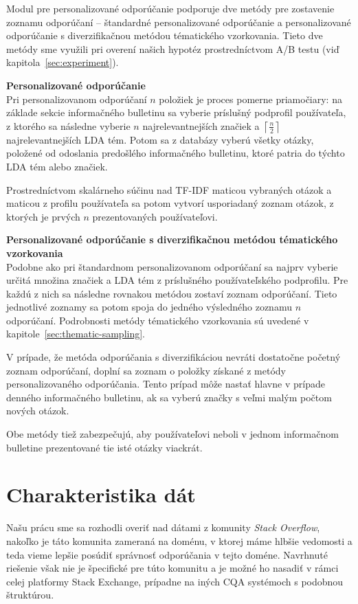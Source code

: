 Modul pre personalizované odporúčanie podporuje dve metódy pre zostavenie zoznamu odporúčaní -- štandardné personalizované
odporúčanie a personalizované odporúčanie s diverzifikačnou metódou tématického vzorkovania. Tieto dve metódy sme využili
pri overení našich hypotéz prostredníctvom A/B testu (viď kapitola~\ref{sec:experiment}).

\textbf{Personalizované odporúčanie}\\
Pri personalizovanom odporúčaní $n$ položiek je proces pomerne priamočiary: na základe sekcie informačného bulletinu
sa vyberie príslušný podprofil používateľa, z ktorého sa následne vyberie $n$ najrelevantnejších značiek
a $\left\lceil\frac{n}{2}\right\rceil$ najrelevantnejších LDA tém. Potom sa z databázy vyberú všetky otázky, položené
od odoslania predošlého informačného bulletinu, ktoré patria do týchto LDA tém alebo značiek.

Prostredníctvom skalárneho súčinu nad TF-IDF maticou vybraných otázok a maticou z profilu používateľa sa potom vytvorí
usporiadaný zoznam otázok, z ktorých je prvých $n$ prezentovaných používateľovi.

\textbf{Personalizované odporúčanie s diverzifikačnou metódou tématického vzorkovania}\\
Podobne ako pri štandardnom personalizovanom odporúčaní sa najprv vyberie určitá množina značiek a LDA tém z
príslušného používateľského podprofilu. Pre každú z nich sa následne rovnakou metódou zostaví zoznam odporúčaní.
Tieto jednotlivé zoznamy sa potom spoja do jedného výsledného zoznamu $n$ odporúčaní. Podrobnosti metódy tématického
vzorkovania sú uvedené v kapitole~\ref{sec:thematic-sampling}.

V prípade, že metóda odporúčania s diverzifikáciou nevráti dostatočne početný zoznam odporúčaní, doplní sa zoznam
o položky získané z metódy personalizovaného odporúčania. Tento prípad môže nastať hlavne v prípade denného informačného
bulletinu, ak sa vyberú značky s veľmi malým počtom nových otázok.

Obe metódy tiež zabezpečujú, aby používateľovi neboli v jednom informačnom bulletine prezentované tie isté otázky
viackrát.


\section{Charakteristika dát}

Našu prácu sme sa rozhodli overiť nad dátami z komunity \textit{Stack Overflow},
nakoľko je táto komunita zameraná na doménu, v ktorej máme hlbšie vedomosti a teda vieme lepšie posúdiť správnosť
odporúčania v tejto doméne. Navrhnuté riešenie však nie je špecifické pre túto komunitu a je možné ho nasadiť v rámci
celej platformy Stack Exchange, prípadne na iných CQA systémoch s podobnou štruktúrou.

